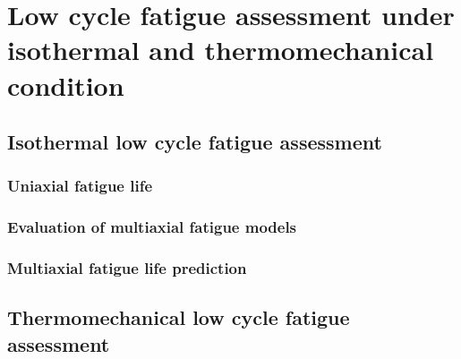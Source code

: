 \chapter{Low cycle fatigue assessment under isothermal and thermomechanical condition}


\graphicspath{{Chapter7/Chapter7Figs/PDF/}{Chapter7/Chapter7Figs/}}

\section{Isothermal low cycle fatigue assessment}

\subsection{Uniaxial fatigue life}
\subsection{Evaluation of multiaxial fatigue models}
\subsection{Multiaxial fatigue life prediction}

\section{Thermomechanical low cycle fatigue assessment}

